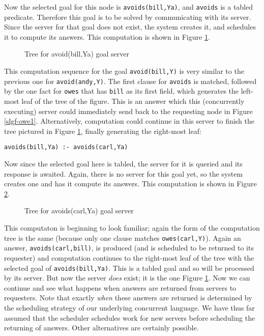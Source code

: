 Now the selected goal for this node is \verb|avoids(bill,Ya)|, and
\verb|avoids| is a tabled predicate.  Therefore this goal is to be
solved by communicating with its server.  Since the server for that
goal does not exist, the system creates it, and schedules it to
compute its answers.  This computation is shown in Figure
\ref{slgf-owe2}.
\begin{figure}
\centerline{}
\caption{Tree for avoid(bill,Ya) goal server}\label{slgf-owe2}
\end{figure}

This computation sequence for the goal \verb|avoid(bill,Y)| is very
similar to the previous one for \verb|avoid(andy,Y)|.  The first
clause for \verb|avoids| is matched, followed by the one fact for
\verb|owes| that has \verb|bill| as its first field, which generates
the left-most leaf of the tree of the figure.  This is an answer which
this (concurrently executing) server could immediately send back to
the requesting node in Figure \ref{slgf-owe1}.  Alternatively,
computation could continue in this server to finish the tree pictured
in Figure \ref{slgf-owe2}, finally generating the right-most leaf:
\begin{verbatim}
avoids(bill,Ya) :- avoids(carl,Ya)
\end{verbatim}
Now since the selected goal here is tabled, the server for it is
queried and its response is awaited.  Again, there is no server for
this goal yet, so the system creates one and has it compute its
answers.  This computation is shown in Figure \ref{slgf-owe3}.
\begin{figure}
\centerline{}
\caption{Tree for avoids(carl,Ya) goal server}\label{slgf-owe3}
\end{figure}

This computaton is beginning to look familiar; again the form of the
computation tree is the same (because only one clause matches
\verb|owes(carl,Y)|).  Again an answer, \verb|avoids(carl,bill)|, is
produced (and is scheduled to be returned to its requester) and
computation continues to the right-most leaf of the tree with the
selected goal of \verb|avoids(bill,Ya)|.  This is a tabled goal and so
will be processed by its server.  But now the server {\em does} exist;
it is the one Figure \ref{slgf-owe2}.  Now we can continue and see
what happens when answers are returned from servers to requesters.
Note that exactly {\em when} these answers are returned is determined
by the scheduling strategy of our underlying concurrent language.  We
have thus far assumed that the scheduler schedules work for new
servers before scheduling the returning of answers.  Other
alternatives are certainly possible.

